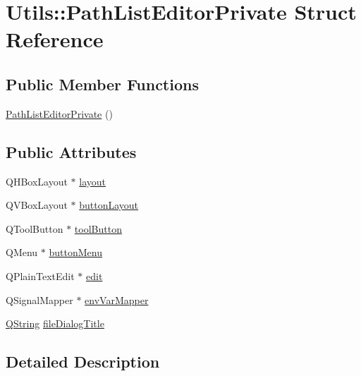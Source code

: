 \hypertarget{struct_utils_1_1_path_list_editor_private}{\section{\-Utils\-:\-:\-Path\-List\-Editor\-Private \-Struct \-Reference}
\label{struct_utils_1_1_path_list_editor_private}
}
\subsection*{\-Public \-Member \-Functions}
\begin{DoxyCompactItemize}
\item 
\hyperlink{struct_utils_1_1_path_list_editor_private_a27e2c9f78f4ffa7ff3c360f853fe0992}{\-Path\-List\-Editor\-Private} ()
\end{DoxyCompactItemize}
\subsection*{\-Public \-Attributes}
\begin{DoxyCompactItemize}
\item 
\-Q\-H\-Box\-Layout $\ast$ \hyperlink{struct_utils_1_1_path_list_editor_private_a49b0f4d77c005208d794903fbad89fba}{layout}
\item 
\-Q\-V\-Box\-Layout $\ast$ \hyperlink{struct_utils_1_1_path_list_editor_private_a47a6d7d811779ccd77d89784f15a14c8}{button\-Layout}
\item 
\-Q\-Tool\-Button $\ast$ \hyperlink{struct_utils_1_1_path_list_editor_private_a885b729d9ae52f2f5eb13193cffd76e5}{tool\-Button}
\item 
\-Q\-Menu $\ast$ \hyperlink{struct_utils_1_1_path_list_editor_private_aa6810f68a0cfbba0afdaea4e6e6746a8}{button\-Menu}
\item 
\-Q\-Plain\-Text\-Edit $\ast$ \hyperlink{struct_utils_1_1_path_list_editor_private_a31a2699dec0693dade54946d3793241e}{edit}
\item 
\-Q\-Signal\-Mapper $\ast$ \hyperlink{struct_utils_1_1_path_list_editor_private_a20a73b993eb36ec2ecd25527d274f962}{env\-Var\-Mapper}
\item 
\hyperlink{group___u_a_v_objects_plugin_gab9d252f49c333c94a72f97ce3105a32d}{\-Q\-String} \hyperlink{struct_utils_1_1_path_list_editor_private_a7f99e038e914397b7afcb6d35eff0142}{file\-Dialog\-Title}
\end{DoxyCompactItemize}


\subsection{\-Detailed \-Description}


